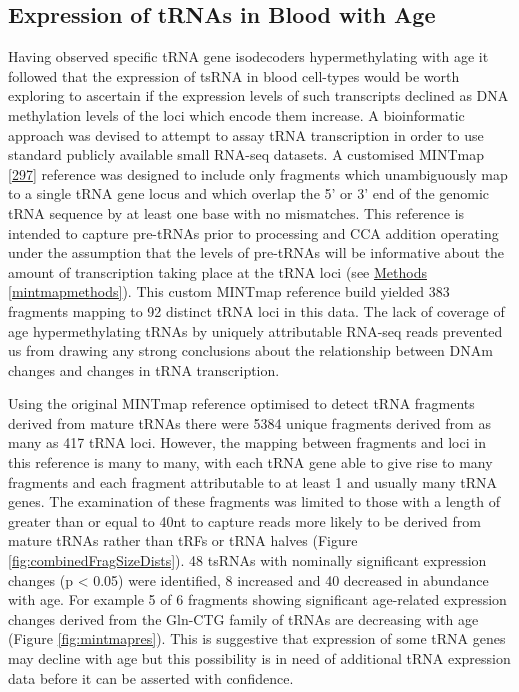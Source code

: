 \documentclass[
]{book}
\begin{document}
\hypertarget{expression-of-trnas-in-blood-with-age}{%
\subsection{Expression of tRNAs in Blood with Age}\label{expression-of-trnas-in-blood-with-age}}

Having observed specific tRNA gene isodecoders hypermethylating with age it followed that the expression of tsRNA in blood cell-types would be worth exploring to ascertain if the expression levels of such transcripts declined as DNA methylation levels of the loci which encode them increase.
A bioinformatic approach was devised to attempt to assay tRNA transcription in order to use standard publicly available small RNA-seq datasets.
A customised MINTmap {[}\protect\hyperlink{ref-Loher2017}{297}{]} reference was designed to include only fragments which unambiguously map to a single tRNA gene locus and which overlap the 5' or 3' end of the genomic tRNA sequence by at least one base with no mismatches.
This reference is intended to capture pre-tRNAs prior to processing and CCA addition operating under the assumption that the levels of pre-tRNAs will be informative about the amount of transcription taking place at the tRNA loci (see \protect\hyperlink{mintmapmethods}{Methods} \ref{mintmapmethods}).
This custom MINTmap reference build yielded 383 fragments mapping to 92 distinct tRNA loci in this data.
The lack of coverage of age hypermethylating tRNAs by uniquely attributable RNA-seq reads prevented us from drawing any strong conclusions about the relationship between DNAm changes and changes in tRNA transcription.

Using the original MINTmap reference optimised to detect tRNA fragments derived from mature tRNAs there were 5384 unique fragments derived from as many as 417 tRNA loci.
However, the mapping between fragments and loci in this reference is many to many, with each tRNA gene able to give rise to many fragments and each fragment attributable to at least 1 and usually many tRNA genes.
The examination of these fragments was limited to those with a length of greater than or equal to 40nt to capture reads more likely to be derived from mature tRNAs rather than tRFs or tRNA halves (Figure \ref{fig:combinedFragSizeDists}).
48 tsRNAs with nominally significant expression changes (p \textless{} 0.05) were identified, 8 increased and 40 decreased in abundance with age.
For example 5 of 6 fragments showing significant age-related expression changes derived from the Gln-CTG family of tRNAs are decreasing with age (Figure \ref{fig:mintmapres}).
This is suggestive that expression of some tRNA genes may decline with age but this possibility is in need of additional tRNA expression data before it can be asserted with confidence.
\end{document}
